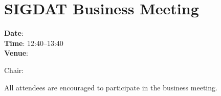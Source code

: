 \section[SIGDAT Business Meeting]{SIGDAT Business Meeting}

\textbf{Date}: \daydateyear \\
\textbf{Time}: 12:40--13:40 \\
\textbf{Venue}: \BusinessMeetingLoc

Chair: 

All attendees are encouraged to participate in the business
meeting. 
